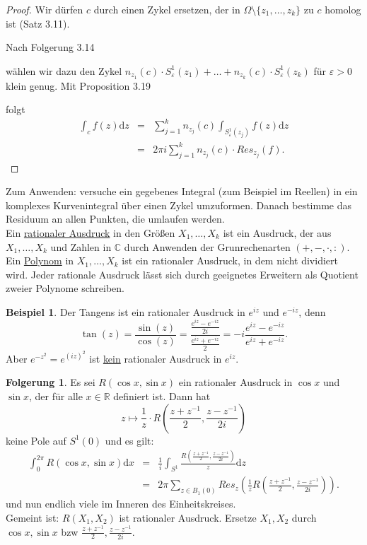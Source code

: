 \documentclass[11pt,titlepage]{article}
\theoremstyle{definition}
\newtheorem{corollary}[theorem]{Folgerung}
\newtheorem{example}[theorem]{Beispiel}
\theoremstyle{remark}
\begin{document}
	\begin{proof}
		Wir dürfen $c$ durch einen Zykel ersetzen, der in $\Omega\setminus\{z_1,\ldots,z_k\}$ zu $c$ 
		homolog ist (Satz 3.11). 
		
		
		Nach Folgerung 3.14 
		
		
		wählen wir dazu den Zykel $n_{z_1}(c)\cdot S_{\varepsilon}^1 (z_1)+\ldots+n_{z_k}(c)\cdot 
		S_{\varepsilon}^1(z_k)$ für $\varepsilon>0$ klein genug. Mit Proposition 3.19 
		
		
		folgt
		\begin{eqnarray*}
			\int_c f(z)\mathrm{d}z &=& \sum_{j=1}^k n_{z_j}(c) \int_{S_{\varepsilon}^1(z_j)}f(z)\mathrm{d}z \\
			&=& 2\pi i\sum_{j=1}^k n_{z_j}(c)\cdot Res_{z_j}(f).
		\end{eqnarray*}
	\end{proof}
	
	Zum Anwenden: versuche ein gegebenes Integral (zum Beispiel im Reellen) in ein komplexes Kurvenintegral 
	über einen Zykel umzuformen. Danach bestimme das Residuum an allen Punkten, die umlaufen werden.\\
	Ein \underline{rationaler Ausdruck} in den Größen $X_1,\ldots,X_k$ ist ein Ausdruck, der aus 
	$X_1,\ldots,X_k$ und Zahlen in $\mathbb{C}$ durch Anwenden der Grunrechenarten $(+,-,\cdot,:)$. 
	Ein \underline{Polynom} in $X_1,\ldots,X_k$ ist ein rationaler Ausdruck, in dem nicht dividiert wird. 
	Jeder rationale Ausdruck lässt sich durch geeignetes Erweitern als Quotient zweier Polynome schreiben.
	
	\begin{example}
		Der Tangens ist ein rationaler Ausdruck in $e^{iz}$ und $e^{-iz}$, denn 
		\[ \tan(z)=\frac{\sin(z)}{\cos(z)}=\frac{\frac{e^{iz}-e^{-iz}}{2i}}{\frac{e^{iz}+e^{-iz}}{2}}=-i
		\frac{e^{iz}-e^{-iz}}{e^{iz}+e^{-iz}}. \]
		Aber $e^{-z^2}=e^{(iz)^2}$ ist \underline{kein} rationaler Ausdruck in $e^{iz}$.
	\end{example}
	
	\begin{corollary}
		Es sei $R(\cos x,\sin x)$ ein rationaler Ausdruck in $\cos x$ und $\sin x$, der für alle $x\in\mathbb{R}$ 
		definiert ist. Dann hat 
		\[ z\mapsto \frac{1}{z} \cdot R(\frac{z+z^{-1}}{2},\frac{z-z^{-1}}{2i}) \]
		keine Pole auf $S^1(0)$ und es gilt:
		\begin{eqnarray*}
			\int_0^{2\pi} R(\cos x,\sin x)\mathrm{d}x &=& \frac{1}{i} \int_{S^1} \frac{R\left(\frac{z+z^{-1}}{2},
			\frac{z-z^{-1}}{2i}\right)}{z} \mathrm{d}z \\
			&=& 2\pi \sum_{z\in B_1(0)} Res_z \left(\frac{1}{z} R\left(\frac{z+z^{-1}}{2},\frac{z-z^{-1}}{2i}\right)
			\right).
		\end{eqnarray*}
		und nun endlich viele im Inneren des Einheitskreises.\\
		Gemeint ist: $R(X_1,X_2)$ ist rationaler Ausdruck. Ersetze $X_1,X_2$ durch $\cos x,\sin x$ bzw 
		$\frac{z+z^{-1}}{2},\frac{z-z^{-1}}{2i}$.
	\end{corollary}
	
\end{document}
